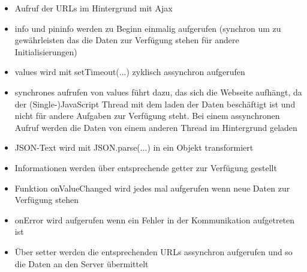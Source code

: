 \begin{itemize}
	\item Aufruf der URLs im Hintergrund mit Ajax
	\item info und pininfo werden zu Beginn einmalig aufgerufen (synchron um zu 
	      gewährleisten das die Daten zur Verfügung stehen für andere Initialisierungen)
	\item values wird mit setTimeout(...) zyklisch assynchron aufgerufen
	\item synchrones aufrufen von values führt dazu, das sich die Webseite aufhängt, da
	      der (Single-)JavaScript Thread mit dem laden der Daten beschäftigt ist und nicht
	      für andere Aufgaben zur Verfügung steht. Bei einem assynchronen Aufruf werden 
	      die Daten von einem anderen Thread im Hintergrund geladen
	\item JSON-Text wird mit JSON.parse(...) in ein Objekt transformiert
	\item Informationen werden über entsprechende getter zur Verfügung gestellt
	\item Funktion onValueChanged wird jedes mal aufgerufen wenn neue Daten zur 
	      Verfügung stehen
	\item onError wird aufgerufen wenn ein Fehler in der Kommunikation aufgetreten ist
	\item Über setter werden die entsprechenden URLs assynchron aufgerufen und so die 
	      Daten an den Server übermittelt
\end{itemize}
